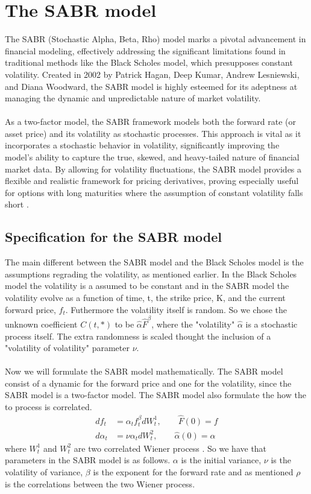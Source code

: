\section{ The SABR model}
The SABR (Stochastic Alpha, Beta, Rho) model marks a pivotal advancement 
in financial modeling, effectively addressing the significant limitations 
found in traditional methods like the Black Scholes model, which presupposes 
constant volatility. Created in 2002 by Patrick Hagan, Deep Kumar, 
Andrew Lesniewski, and Diana Woodward, the SABR model is highly esteemed for 
its adeptness at managing the dynamic and unpredictable nature of market 
volatility.
\\\\
As a two-factor model, the SABR framework models both the forward rate 
(or asset price) and its volatility as stochastic processes. This approach 
is vital as it incorporates a stochastic behavior in volatility, significantly 
improving the model's ability to capture the true, skewed, and heavy-tailed 
nature of financial market data. By allowing for volatility fluctuations, 
the SABR model provides a flexible and realistic framework for pricing 
derivatives, proving especially useful for options with long maturities where 
the assumption of constant volatility falls short \cite{Smile}.

\subsection{Specification for the SABR model}
The main different between the SABR model and the 
Black Scholes model is the assumptions regrading the 
volatility, as mentioned earlier. In the Black Scholes 
model the volatility is a assumed to be constant and 
in the SABR model the volatility evolve as a function
of time, t, the strike price, K, and the current
forward price, $f_t$. Futhermore the volatility itself
is random. So we chose the unknown coefficient $C(t,*)$
to be $\hat{\alpha} \hat{F}^{\beta}$, where the 
"volatility" $\hat{\alpha}$ is a stochastic process itself. 
The extra randomness is scaled thought the inclusion 
of a "volatility of volatility" parameter $\nu$.
\\\\
Now we will formulate the SABR model mathematically. 
The SABR model consist of a dynamic for the forward price
and one for the volatility, since the SABR model is a 
two-factor model. The SABR model also formulate the 
how the to process is correlated. 
\begin{align}
    df_t &= \alpha_t f_t^\beta dW_t^1, \quad \quad \hat{F}(0)=f  \\
    d\alpha_t &= \nu \alpha_t dW_t^2, \quad \quad \hat{\alpha}(0)=\alpha
\end{align}
where $W_t^{1}$ and $W_t^{2}$ are two correlated Wiener 
process \cite{Smile}. So we have that 
parameters in the SABR model is as follows. $\alpha$ is
the initial variance, $\nu$ is the volatility of
variance, $\beta$ is the exponent for the forward rate 
and as mentioned $\rho$ is the correlations between the 
two Wiener process. 

